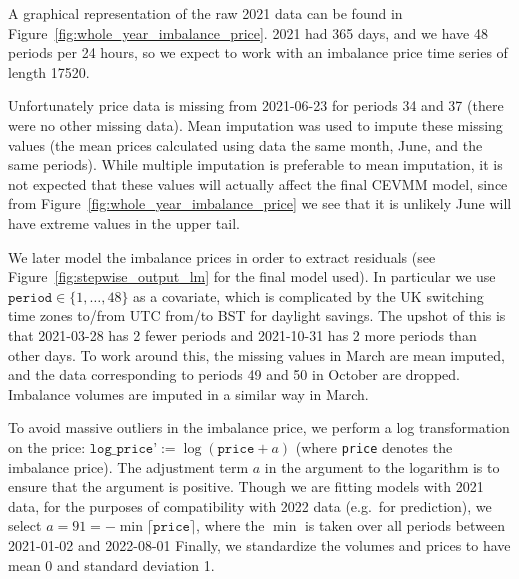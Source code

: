 \documentclass[11pt,twoside,openany]{book}
\newcommand{\code}[1]{\texttt{#1}}
\numberwithin{Theorem}{chapter}
\numberwithin{Definition}{chapter}
\numberwithin{Lemma}{chapter}
\numberwithin{Algorithm}{chapter}
\numberwithin{equation}{chapter}
\begin{document}
A graphical representation of the raw 2021 data can be found in
Figure~\ref{fig:whole_year_imbalance_price}. 2021 had 365 days, and we have 48
periods per 24 hours, so we expect to work with an imbalance price time series of
length 17520.

Unfortunately price data is missing from 2021-06-23 for periods 34 and 37
(there were no other missing data). Mean imputation was used to impute these
missing values (the mean prices calculated using data the same month, June, and the same
periods). While multiple imputation is preferable to mean imputation, it is not
expected that these values will actually affect the final CEVMM model, since
from Figure~\ref{fig:whole_year_imbalance_price} we see that it is unlikely June will have
extreme values in the upper tail.

We later model the imbalance prices in order to extract residuals (see
Figure~\ref{fig:stepwise_output_lm} for the final model used). In particular we
use $\code{period}\in\{1,\ldots,48\}$ as a covariate, which is complicated by
the UK switching time zones to/from UTC from/to BST for daylight savings. The
upshot of this is that 2021-03-28 has 2 fewer periods and 2021-10-31 has 2 more
periods than other days. To work around this, the missing values in March are
mean imputed, and the data corresponding to periods 49 and 50 in October are
dropped. Imbalance volumes are imputed in a similar way in March.


To avoid massive outliers in the imbalance price, we perform a log transformation on the
price: $\code{log_price'}:= \log(\code{price} + a)$ (where \code{price} denotes the imbalance price).
The adjustment term $a$ in the argument to the logarithm is to ensure that the argument is positive.
Though we are fitting models with 2021 data, for the purposes of compatibility with
2022 data (e.g.\ for prediction), we select $a=91=-\min\lceil\code{price}\rceil$,
where the $\min$ is taken over all periods between 2021-01-02 and 2022-08-01
 Finally, we standardize the volumes and prices
to have mean 0 and standard deviation 1.
\end{document}

